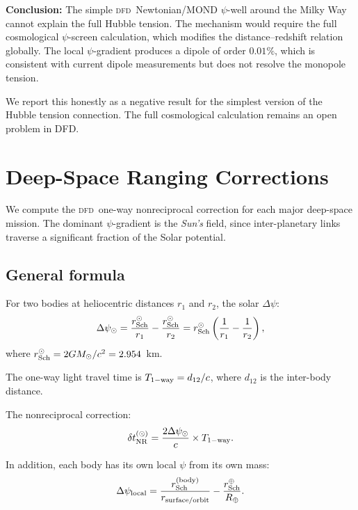 \documentclass[aps,prl,twocolumn,superscriptaddress,showpacs]{revtex4-2}
\newcommand{\DFD}{\textsc{dfd}}
\newcommand{\Msun}{M_\odot}
\newcommand{\Rearth}{R_\oplus}
\newcommand{\rSch}{r_{\rm Sch}}
\begin{document}
\textbf{Conclusion:} The simple \DFD\ Newtonian/MOND $\psi$-well
around the Milky Way cannot explain the full Hubble tension.
The mechanism would require the full cosmological $\psi$-screen
calculation, which modifies the distance--redshift relation
globally.  The local $\psi$-gradient produces a dipole of order
$0.01\%$, which is consistent with current dipole measurements
but does not resolve the monopole tension.

We report this honestly as a negative result for the simplest
version of the Hubble tension connection.  The full cosmological
calculation remains an open problem in DFD.

\section{Deep-Space Ranging Corrections}\label{sec:deep_space}

We compute the \DFD\ one-way nonreciprocal correction for each
major deep-space mission.  The dominant $\psi$-gradient is the
\emph{Sun's} field, since inter-planetary links traverse a
significant fraction of the Solar potential.

\subsection{General formula}

For two bodies at heliocentric distances $r_1$ and $r_2$, the
solar $\Delta\psi$:
\begin{equation}
\Delta\psi_\odot = \frac{\rSch^\odot}{r_1} - \frac{\rSch^\odot}{r_2}
= \rSch^\odot\left(\frac{1}{r_1} - \frac{1}{r_2}\right),
\end{equation}
where $\rSch^\odot = 2G\Msun/c^2 = 2.954$~km.

The one-way light travel time is $T_{\rm 1-way} = d_{12}/c$,
where $d_{12}$ is the inter-body distance.

The nonreciprocal correction:
\begin{equation}
\delta t_{\rm NR}^{(\odot)} = \frac{2\Delta\psi_\odot}{c}
\times T_{\rm 1-way}.
\label{eq:NR_solar_ds}
\end{equation}

In addition, each body has its own local $\psi$ from its own mass:
\begin{equation}
\Delta\psi_{\rm local} = \frac{\rSch^{(\rm body)}}{r_{\rm surface/orbit}}
- \frac{\rSch^\oplus}{\Rearth}.
\end{equation}
\end{document}
